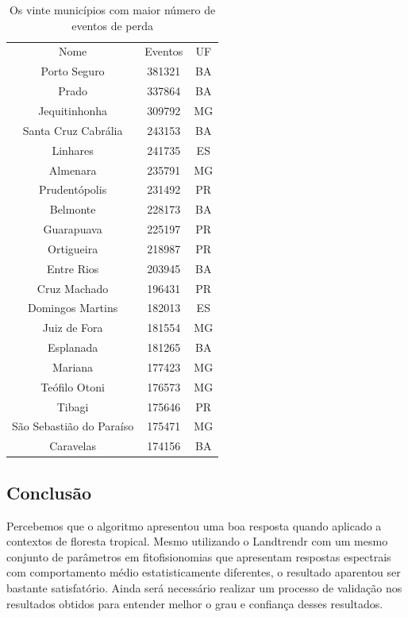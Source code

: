 \begin{table}[H]
    \centering
    \begin{tabular}{|c | c | c|}
    \hline
                            Nome & Eventos & UF \\
                Porto Seguro & 381321 & BA \\ 
                       Prado & 337864 & BA \\
                Jequitinhonha & 309792 & MG \\
        Santa Cruz Cabrália & 243153 & BA \\
                    Linhares & 241735 & ES \\
                      Almenara & 235791 & MG \\
              Prudentópolis & 231492 & PR \\
                    Belmonte & 228173 & BA \\
                  Guarapuava & 225197 & PR \\
                  Ortigueira & 218987 & PR \\
                  Entre Rios & 203945 & BA \\
                   Cruz Machado & 196431 & PR \\
            Domingos Martins & 182013 & ES \\
                 Juiz de Fora & 181554 & MG \\
                   Esplanada & 181265 & BA \\
                      Mariana & 177423 & MG \\
               Teófilo Otoni & 176573 & MG \\
                      Tibagi & 175646 & PR \\
  São Sebastião do Paraíso & 175471 & MG \\
                   Caravelas & 174156 & BA \\
    \hline
    \end{tabular}
    \caption{Os vinte municípios com maior número de eventos de perda}
    \label{tab:mun_gain}
\end{table}


\subsection{Conclusão}

\hspace{13pt} Percebemos que o algoritmo apresentou uma boa resposta quando aplicado a contextos de floresta tropical. Mesmo utilizando o Landtrendr com um mesmo conjunto de parâmetros em fitofisionomias que apresentam respostas espectrais com comportamento médio estatisticamente diferentes, o resultado aparentou ser bastante satisfatório. Ainda será necessário realizar um processo de validação nos resultados obtidos para entender melhor o grau e confiança desses resultados.


